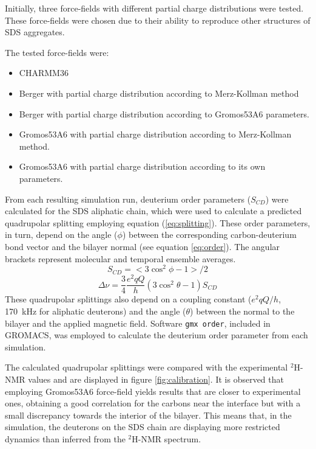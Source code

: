 \documentclass[3p,preprint,review]{elsarticle}
\begin{document}
	Initially,
	three force-fields with different partial charge distributions were tested.
	These force-fields were chosen due to their ability to reproduce other
	structures of
	SDS aggregates\cite{Tang2014}.\par
	The tested force-fields were:
	\begin{itemize}
		\item CHARMM36\cite{Vanommeslaeghe2009}
		\item Berger\cite{Berger1997} with partial charge distribution according to
		Merz-Kollman
		method\cite{Besler1990}
		\item Berger with partial charge distribution according to
		Gromos53A6\cite{Oostenbrink2004}
		parameters.
		\item Gromos53A6 with partial charge distribution according to Merz-Kollman
		method.
		\item Gromos53A6 with partial charge distribution according to its own
		parameters.
	\end{itemize}
	
	From each resulting simulation run, deuterium order parameters ($S_{CD}$) were
	calculated for the SDS aliphatic chain, which were used to calculate a
	predicted
	quadrupolar splitting employing equation (\ref{eq:splitting}). These order parameters, in turn, depend on the angle ($\phi$) between the corresponding carbon-deuterium bond vector and the bilayer normal (see equation \ref{eq:order}). The angular brackets represent molecular and temporal ensemble averages.
	\begin{equation}
	\label{eq:order}
	S_{CD} = <3 \cos^2\phi -1>/2
	\end{equation}
	\begin{equation}
	\label{eq:splitting}
	\Delta\nu = \frac{3}{4} \frac{e^2qQ}{h}(3\cos^2\theta - 1) S_{CD}
	\end{equation}
	These
	quadrupolar splittings also depend on
	a
	coupling constant ($e^2qQ/h$, \SI{170}{kHz} for aliphatic
	deuterons\cite{Davis1983}) and the angle ($\theta$) between the normal to the
	bilayer and the
	applied magnetic field. Software \texttt{gmx order}, included in GROMACS, was
	employed to calculate the deuterium order parameter from each simulation.
	

	
	The calculated quadrupolar splittings were compared with the experimental
	$^2$H-NMR values and are
	displayed in figure \ref{fig:calibration}. It is observed that employing
	Gromos53A6 force-field yields results that are closer to experimental ones,
	obtaining a good correlation for the carbons
	near the interface but with a small discrepancy towards the interior of the
	bilayer. This means that, in the simulation, the deuterons on the SDS chain are
	displaying more
	restricted dynamics than inferred from the $^2$H-NMR spectrum.
	
\end{document}
